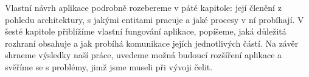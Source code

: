 Vlastní návrh aplikace podrobně rozebereme v páté kapitole: její členění z pohledu architektury, s jakými entitami pracuje a jaké procesy v ní probíhají.
V šesté kapitole přiblížíme vlastní fungování aplikace, popíšeme, jaká důležitá rozhraní obsahuje a jak probíhá komunikace jejích jednotlivých částí.
Na závěr shrneme výsledky naší práce, uvedeme možná budoucí rozšíření aplikace a svěříme se s problémy, jimž jsme museli při vývoji čelit.

